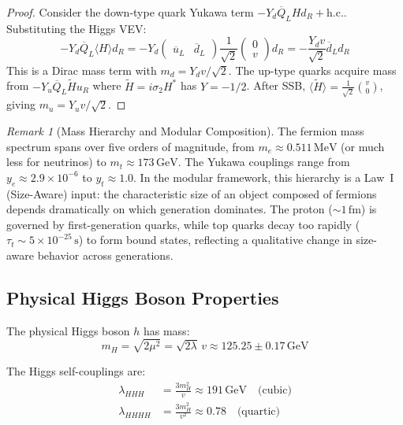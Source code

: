 \documentclass[12pt]{article}
\theoremstyle{definition}
\theoremstyle{remark}
\newtheorem{remark}[theorem]{Remark}
\newcommand{\Qbar}{\overline{Q}}
\newcommand{\ubar}{\overline{u}}
\newcommand{\dbar}{\overline{d}}
\newcommand{\Htilde}{\widetilde{H}}
\newcommand{\GeV}{\,\mathrm{GeV}}
\newcommand{\MeV}{\,\mathrm{MeV}}
\begin{document}
\begin{proof}
Consider the down-type quark Yukawa term $-Y_d \Qbar_L H d_R + \mathrm{h.c.}$. Substituting the Higgs VEV:
\begin{equation}
-Y_d \Qbar_L \langle H \rangle d_R = -Y_d \begin{pmatrix} \ubar_L & \dbar_L \end{pmatrix} \frac{1}{\sqrt{2}}\begin{pmatrix} 0 \\ v \end{pmatrix} d_R = -\frac{Y_d v}{\sqrt{2}} \dbar_L d_R
\end{equation}
This is a Dirac mass term with $m_d = Y_d v / \sqrt{2}$. The up-type quarks acquire mass from $-Y_u \Qbar_L \Htilde u_R$ where $\Htilde = i\sigma_2 H^*$ has $Y = -1/2$. After SSB, $\langle \Htilde \rangle = \frac{1}{\sqrt{2}}\binom{v}{0}$, giving $m_u = Y_u v / \sqrt{2}$.
\end{proof}

\begin{remark}[Mass Hierarchy and Modular Composition]
\label{rem:masshierarchy}
The fermion mass spectrum spans over five orders of magnitude, from $m_e \approx 0.511\MeV$ (or much less for neutrinos) to $m_t \approx 173\GeV$. The Yukawa couplings range from $y_e \approx 2.9 \times 10^{-6}$ to $y_t \approx 1.0$. In the modular framework, this hierarchy is a Law~I (Size-Aware) input: the characteristic size of an object composed of fermions depends dramatically on which generation dominates. The proton ($\sim 1\,\mathrm{fm}$) is governed by first-generation quarks, while top quarks decay too rapidly ($\tau_t \sim 5 \times 10^{-25}\,\mathrm{s}$) to form bound states, reflecting a qualitative change in size-aware behavior across generations.
\end{remark}

\subsection{Physical Higgs Boson Properties}

The physical Higgs boson $h$ has mass:
\begin{equation}
m_H = \sqrt{2\mu^2} = \sqrt{2\lambda}\, v \approx 125.25 \pm 0.17\GeV
\end{equation}

The Higgs self-couplings are:
\begin{align}
\lambda_{HHH} &= \frac{3m_H^2}{v} \approx 191\GeV \quad \text{(cubic)} \\
\lambda_{HHHH} &= \frac{3m_H^2}{v^2} \approx 0.78 \quad \text{(quartic)}
\end{align}
\end{document}
